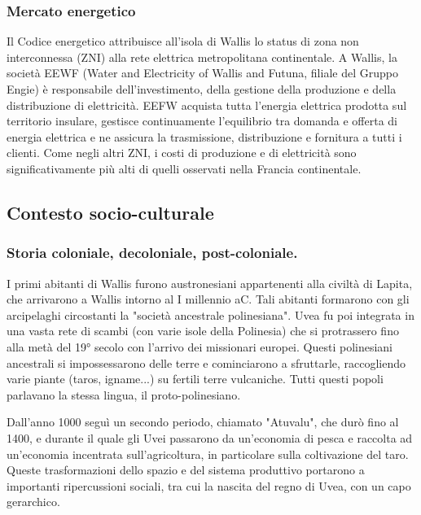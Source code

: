 \documentclass[fleqn,11pt]{SelfArx} %
\begin{document}
\subsubsection{Mercato energetico}
Il Codice energetico attribuisce all'isola di Wallis lo status di zona non interconnessa (ZNI) alla rete elettrica metropolitana continentale.
A Wallis, la società EEWF (Water and Electricity of Wallis and Futuna, filiale del Gruppo Engie) è responsabile dell'investimento, della gestione della produzione e della distribuzione di elettricità.
EEFW acquista tutta l'energia elettrica prodotta sul territorio insulare, gestisce continuamente l'equilibrio tra domanda e offerta di energia elettrica e ne assicura la trasmissione, distribuzione e fornitura a tutti i clienti. 
Come negli altri ZNI, i costi di produzione e di elettricità sono significativamente più alti di quelli osservati nella Francia continentale.

\subsection{Contesto socio-culturale}
\subsubsection{Storia coloniale, decoloniale, post-coloniale.}
I primi abitanti di Wallis furono austronesiani appartenenti alla civiltà di Lapita, che arrivarono a Wallis intorno al I millennio aC.
Tali abitanti formarono con gli arcipelaghi circostanti la "società ancestrale polinesiana".
Uvea fu poi integrata in una vasta rete di scambi (con varie isole della Polinesia) che si protrassero fino alla metà del 19° secolo con l'arrivo dei missionari europei.
Questi polinesiani ancestrali si impossessarono delle terre e cominciarono a sfruttarle, raccogliendo varie piante (taros, igname...) su fertili terre vulcaniche.
Tutti questi popoli parlavano la stessa lingua, il proto-polinesiano.

Dall'anno 1000 seguì un secondo periodo, chiamato "Atuvalu", che durò fino al 1400, e durante il quale gli Uvei passarono da un'economia di pesca e raccolta ad un'economia incentrata sull'agricoltura, in particolare sulla coltivazione del taro. 
Queste trasformazioni dello spazio e del sistema produttivo portarono a importanti ripercussioni sociali, tra cui la nascita del regno di Uvea, con un capo gerarchico.
\end{document}
